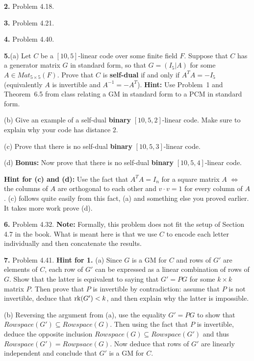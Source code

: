 \documentclass[12pt]{amsart}
\begin{document}
{\bf 2.} Problem 4.18.
\skv

{\bf 3.} Problem 4.21.
\skv

{\bf 4.} Problem 4.40.
\skv

{\bf 5.}(a) Let $C$ be a $[10,5]$-linear code over some finite field $F$. Suppose that $C$ has a generator matrix $G$ in standard form, so that
$G=(I_5 | A)$ for some $A\in Mat_{5\times 5}(F)$. Prove that $C$ is {\bf self-dual} if and only if $A^{T}A=-I_5$ (equivalently $A$ is invertible and $A^{-1}=-A^T$). {\bf Hint:} Use Problem~1 and Theorem~6.5 from class relating a GM in standard form to a PCM in standard form. 
\skv

(b) Give an example of a self-dual {\bf binary} $[10,5,2]$-linear code. Make sure to explain why your code has distance $2$.
\skv

(c) Prove that there is no self-dual {\bf binary} $[10,5,3]$-linear code.
\skv

(d) {\bf Bonus:} Now prove that there is no self-dual {\bf binary} $[10,5,4]$-linear code. 
\skv

{\bf Hint for (c) and (d):} Use the fact that $A^T A=I_n$ for a square matrix $A$ 
$\iff$ the columns of $A$ are orthogonal to each other and $v\cdot v=1$ for every column of $A$. (c) follows quite easily from this fact, (a) and something else you proved earlier. It takes more work prove (d).
\skv

{\bf 6.} Problem 4.32. {\bf Note:} Formally, this problem does not fit the setup of Section 4.7 in the book. What is meant here is that we use $C$ to encode each letter individually and then concatenate the results.
\skv

{\bf 7.} Problem 4.41.
\newpage
{\bf Hint for 1.} (a) Since $G$ is a GM for $C$ and rows of $G'$ are elements of $C$, each row of $G'$ can be expressed as a linear combination of rows of $G$. Show that the latter is equivalent to saying that $G'=PG$ for some $k\times k$
matrix $P$. Then prove that $P$ is invertible by contradiction: assume that $P$ is not invertible, deduce that 
${\rm rk}(G')<k$, and then explain why the latter is impossible.

(b) Reversing the argument from (a), use the equality $G'=PG$ to show that $Rowspace(G')\subseteq Rowspace(G)$. Then using the fact that $P$ is invertible, deduce the opposite inclusion $Rowspace(G)\subseteq Rowspace(G')$ and thus
$Rowspace(G')=Rowpsace(G)$. Now deduce that rows of $G'$ are linearly independent and conclude that $G'$ is a GM for $C$.
\end{document}
